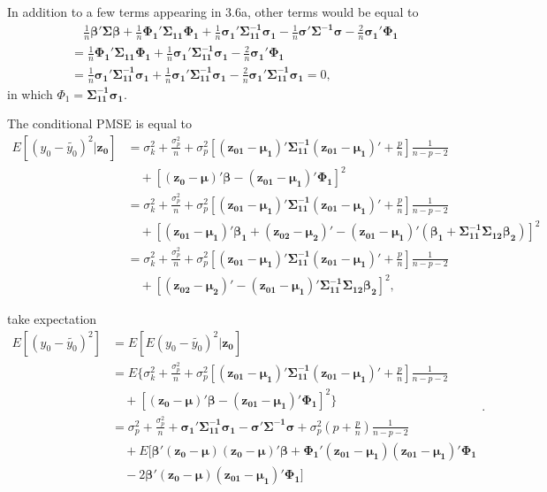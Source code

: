 In addition to a few terms appearing in 3.6a, other terms would be equal to
$$\begin{aligned}
&\quad\frac{1}{n}\boldsymbol{\beta'\Sigma\beta}+\frac{1}{n}\boldsymbol{\Phi_1'\Sigma_{11}\Phi_1}+\frac{1}{n}\boldsymbol{\sigma_1'\Sigma_{11}^{-1}\sigma_1}-\frac{1}{n}\boldsymbol{\sigma'\Sigma^{-1}\sigma}-\frac{2}{n}\boldsymbol{\sigma_1'\Phi_1}\\
&=\frac{1}{n}\boldsymbol{\Phi_1'\Sigma_{11}\Phi_1}+\frac{1}{n}\boldsymbol{\sigma_1'\Sigma_{11}^{-1}\sigma_1}-\frac{2}{n}\boldsymbol{\sigma_1'\Phi_1}\\
&=\frac{1}{n}\boldsymbol{\sigma_1'\Sigma_{11}^{-1}\sigma_1}+\frac{1}{n}\boldsymbol{\sigma_1'\Sigma_{11}^{-1}\sigma_1}-\frac{2}{n}\boldsymbol{\sigma_1'\Sigma_{11}^{-1}\sigma_1}=0,
\end{aligned}$$
in which $\Phi_1 = \boldsymbol{\Sigma_{11}^{-1}\sigma_1}$.



The conditional PMSE is equal to
$$\begin{aligned}
E[(y_0-\tilde{y_0})^2|\boldsymbol{z_0}] &= \sigma_k^2+\frac{\sigma_p^2}{n}+\sigma_p^2\left[\boldsymbol{(z_{01}-\mu_1)'\Sigma_{11}^{-1}(z_{01}-\mu_1)'}+\frac{p}{n}\right]\frac{1}{n-p-2}\\
&\quad+[\boldsymbol{(z_0-\mu)'\beta-(z_{01}-\mu_1)'\Phi_1}]^2\\
&=\sigma_k^2+\frac{\sigma_p^2}{n}+\sigma_p^2\left[\boldsymbol{(z_{01}-\mu_1)'\Sigma_{11}^{-1}(z_{01}-\mu_1)'}+\frac{p}{n}\right]\frac{1}{n-p-2}\\
&\quad+[\boldsymbol{(z_{01}-\mu_1)'\beta_1+(z_{02}-\mu_2)'-(z_{01}-\mu_1)'(\beta_1+\Sigma_{11}^{-1}\Sigma_{12}\beta_2)}]^2\\
&=\sigma_k^2+\frac{\sigma_p^2}{n}+\sigma_p^2\left[\boldsymbol{(z_{01}-\mu_1)'\Sigma_{11}^{-1}(z_{01}-\mu_1)'}+\frac{p}{n}\right]\frac{1}{n-p-2}\\
&\quad+[\boldsymbol{(z_{02}-\mu_2)'-(z_{01}-\mu_1)'\Sigma_{11}^{-1}\Sigma_{12}\beta_2}]^2,
\end{aligned}$$


take expectation
$$\begin{aligned}
E[(y_0-\tilde{y_0})^2]
&=E[E(y_0-\tilde{y_0})^2|\boldsymbol{z_0}]\\
&=E\{\sigma_k^2+\frac{\sigma_p^2}{n}+\sigma_p^2\left[\boldsymbol{(z_{01}-\mu_1)'\Sigma_{11}^{-1}(z_{01}-\mu_1)'}+\frac{p}{n}\right]\frac{1}{n-p-2}\\
&\quad+[\boldsymbol{(z_0-\mu)'\beta-(z_{01}-\mu_1)'\Phi_1}]^2\}\\
&=\sigma_p^2+\frac{\sigma_p^2}{n}+\boldsymbol{\sigma_1'\Sigma_{11}^{-1}\sigma_1-\sigma'\Sigma^{-1}\sigma}+\sigma_p^2\left(p+\frac{p}{n}\right)\frac{1}{n-p-2}\\
&\quad+E[\boldsymbol{\beta'(z_0-\mu)(z_0-\mu)'\beta+\Phi_1'(z_{01}-\mu_1)(z_{01}-\mu_1)'\Phi_1}\\
&\quad-2\boldsymbol{\beta'(z_0-\mu)(z_{01}-\mu_1)'\Phi_1}]
\end{aligned}.$$

